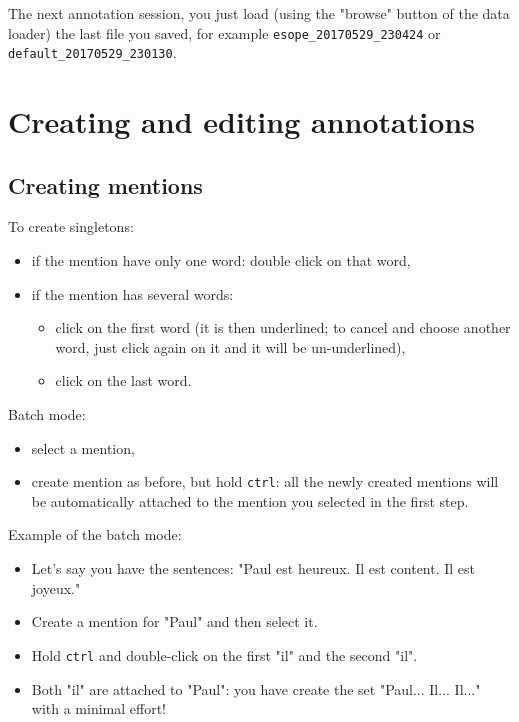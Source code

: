 \documentclass[12pt]{article}
\begin{document}
The next annotation session, you just load (using the "browse" button of the
data loader) the last file you saved, for example
\verb|esope_20170529_230424| or \verb|default_20170529_230130|.

 \section{Creating and editing annotations}

 \subsection{Creating mentions}

\label{sec:creating-mentions}

To create singletons:
\begin{itemize}
   \item if the mention have only one word: double click on that word,
   \item if the mention has several words:
     \begin{itemize}
         \item click on the first word (it is then underlined; to cancel and
         choose another word, just click again on it and it will be
         un-underlined),
         \item click on the last word.
      \end{itemize}
\end{itemize}

Batch mode:
\begin{itemize}
   \item select a mention,
   \item create mention as before, but hold \verb|ctrl|: all the newly
   created mentions will be automatically attached to the mention you
   selected in the first step.
\end{itemize}

Example of the batch mode:
\begin{itemize}
   \item Let's say you have the sentences: "Paul est heureux.  Il est
   content. Il est joyeux."
   \item Create a mention for "Paul" and then select it.
   \item Hold \verb|ctrl| and double-click on the first "il" and the second
   "il".
   \item Both "il" are attached to "Paul": you have create the set "Paul...
   Il... Il..." with a minimal effort!
\end{itemize}
\end{document}
